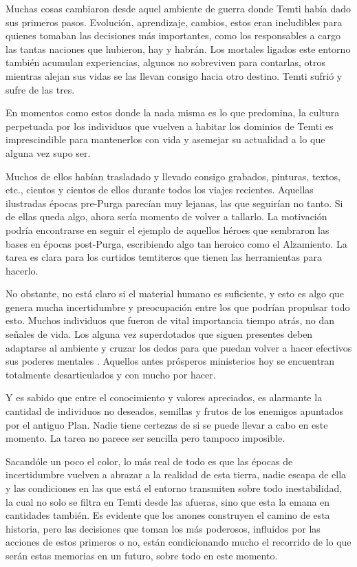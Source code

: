 \documentclass[
  spanish,
]{book}
\begin{document}
Muchas cosas cambiaron desde aquel ambiente de guerra donde Temti había dado sus primeros pasos. Evolución, aprendizaje, cambios, estos eran ineludibles para quienes tomaban las decisiones más importantes, como los responsables a cargo las tantas naciones que hubieron, hay y habrán.
Los mortales ligados este entorno también acumulan experiencias, algunos no sobreviven para contarlas, otros mientras alejan sus vidas se las llevan consigo hacia otro destino. Temti sufrió y sufre de las tres.

En momentos como estos donde la nada misma es lo que predomina, la cultura perpetuada por los individuos que vuelven a habitar los dominios de Temti es imprescindible para mantenerlos con vida y asemejar su actualidad a lo que alguna vez supo ser.

Muchos de ellos habían trasladado y llevado consigo grabados, pinturas, textos, etc., cientos y cientos de ellos durante todos los viajes recientes. Aquellas ilustradas épocas pre-Purga parecían muy lejanas, las que seguirían no tanto. Si de ellas queda algo, ahora sería momento de volver a tallarlo. La motivación podría encontrarse en seguir el ejemplo de aquellos héroes que sembraron las bases en épocas post-Purga, escribiendo algo tan heroico como el Alzamiento. La tarea es clara para los curtidos temtiteros que tienen las herramientas para hacerlo.

No obstante, no está claro si el material humano es suficiente, y esto es algo que genera mucha incertidumbre y preocupación entre los que podrían propulsar todo esto. Muchos individuos que fueron de vital importancia tiempo atrás, no dan señales de vida. Los alguna vez superdotados que siguen presentes deben adaptarse al ambiente y cruzar los dedos para que puedan volver a hacer efectivos sus poderes mentales . Aquellos antes prósperos ministerios hoy se encuentran totalmente desarticulados y con mucho por hacer.

Y es sabido que entre el conocimiento y valores apreciados, es alarmante la cantidad de individuos no deseados, semillas y frutos de los enemigos apuntados por el antiguo Plan. Nadie tiene certezas de si se puede llevar a cabo en este momento. La tarea no parece ser sencilla pero tampoco imposible.

Sacandóle un poco el color, lo más real de todo es que las épocas de incertidumbre vuelven a abrazar a la realidad de esta tierra, nadie escapa de ella y las condiciones en las que está el entorno transmiten sobre todo inestabilidad, la cual no solo se filtra en Temti desde las afueras, sino que esta la emana en cantidades también. Es evidente que los anones construyen el camino de esta historia, pero las decisiones que toman los más poderosos, influidos por las acciones de estos primeros o no, están condicionando mucho el recorrido de lo que serán estas memorias en un futuro, sobre todo en este momento.
\end{document}
